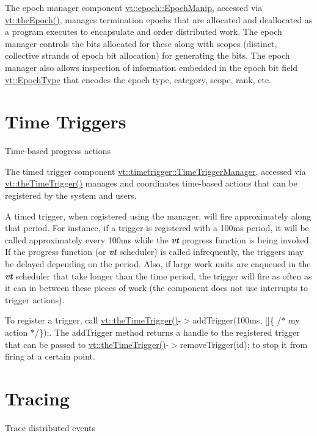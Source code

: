 The epoch manager component {\ttfamily \hyperlink{structvt_1_1epoch_1_1_epoch_manip}{vt\+::epoch\+::\+Epoch\+Manip}}, accessed via {\ttfamily \hyperlink{namespacevt_ad246530e523687095c567ccab203556a}{vt\+::the\+Epoch()}}, manages termination epochs that are allocated and deallocated as a program executes to encapsulate and order distributed work. The epoch manager controls the bits allocated for these along with scopes (distinct, collective strands of epoch bit allocation) for generating the bits. The epoch manager also allows inspection of information embedded in the epoch bit field {\ttfamily \hyperlink{namespacevt_a81d11b28122d43bf9834577e4a06440f}{vt\+::\+Epoch\+Type}} that encodes the epoch type, category, scope, rank, etc. \hypertarget{time-trigger}{}\section{Time Triggers}\label{time-trigger}
Time-\/based progress actions

The timed trigger component {\ttfamily \hyperlink{structvt_1_1timetrigger_1_1_time_trigger_manager}{vt\+::timetrigger\+::\+Time\+Trigger\+Manager}}, accessed via {\ttfamily \hyperlink{namespacevt_a1e1a39cdf2a3fc1adefcdfcca4716bf2}{vt\+::the\+Time\+Trigger()}} manages and coordinates time-\/based actions that can be registered by the system and users.

A timed trigger, when registered using the manager, will fire approximately along that period. For instance, if a trigger is registered with a 100ms period, it will be called approximately every 100ms while the {\bfseries {\itshape vt}} progress function is being invoked. If the progress function (or {\bfseries {\itshape vt}} scheduler) is called infrequently, the triggers may be delayed depending on the period. Also, if large work units are enqueued in the {\bfseries {\itshape vt}} scheduler that take longer than the time period, the trigger will fire as often as it can in between these pieces of work (the component does not use interrupts to trigger actions).

To register a trigger, call {\ttfamily \hyperlink{namespacevt_a1e1a39cdf2a3fc1adefcdfcca4716bf2}{vt\+::the\+Time\+Trigger()}-\/$>$add\+Trigger(100ms, \mbox{[}\mbox{]}\{ /$\ast$ my action $\ast$/\});}. The {\ttfamily add\+Trigger} method returns a handle to the registered trigger that can be passed to {\ttfamily \hyperlink{namespacevt_a1e1a39cdf2a3fc1adefcdfcca4716bf2}{vt\+::the\+Time\+Trigger()}-\/$>$remove\+Trigger(id);} to stop it from firing at a certain point. \hypertarget{trace}{}\section{Tracing}\label{trace}
Trace distributed events


